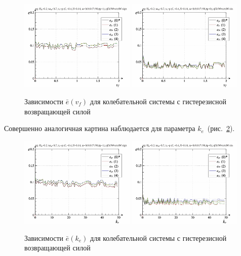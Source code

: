 \begin{figure}[ht!]
\begin{center}
  \includegraphics[width=0.49\textwidth]{p/cha/vg/vg_id-p_v_f_sign.png}
  \hfill
  \includegraphics[width=0.49\textwidth]{p/cha/vg/vg_id-p_v_f_sin.png}
\end{center}
  \caption{Зависимости $\bar{e}(v_f)$ для колебательной системы с гистерезисной возвращающей силой}
\label{atu:f:vg_e_v_f}
\end{figure}

Совершенно аналогичная картина наблюдается для параметра $k_e$~(рис.~\ref{atu:f:vg_e_k_e}).

\begin{figure}[ht!]
\begin{center}
  \includegraphics[width=0.49\textwidth]{p/cha/vg/vg_id-p_k_e_sign.png}
  \hfill
  \includegraphics[width=0.49\textwidth]{p/cha/vg/vg_id-p_k_e_sin.png}
\end{center}
  \caption{Зависимости $\bar{e}(k_e)$ для колебательной системы с гистерезисной возвращающей силой}
\label{atu:f:vg_e_k_e}
\end{figure}

